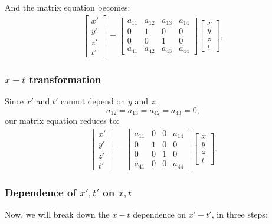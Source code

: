 \documentclass[a4paper,11pt]{article}
\numberwithin{equation}{section}
\begin{document}
 \noindent And the matrix equation becomes:
 \begin{gather}
 \begin{bmatrix} x' \\ y' \\ z' \\ t' \end{bmatrix}
 =
 \begin{bmatrix}
 a_{11} & a_{12} & a_{13} & a_{14}\\
 0 & 1 & 0 & 0\\
 0 & 0 & 1 & 0\\
 a_{41} & a_{42} & a_{43} & a_{44}
 \end{bmatrix}
 \begin{bmatrix}
 x \\ y \\ z \\ t
 \end{bmatrix},
 \end{gather}
   
 \subsubsection{$x-t$ transformation}
 Since $x'$ and $t'$ cannot depend on $y$ and $z$: $$ a_{12} = a_{13} = a_{42} = a_{43} = 0,$$ our matrix equation reduces to:
 \begin{gather}
 \begin{bmatrix} x' \\ y' \\ z' \\ t' \end{bmatrix}
 =
 \begin{bmatrix}
 a_{11} & 0 & 0 & a_{14}\\
 0 & 1 & 0 & 0\\
 0 & 0 & 1 & 0\\
 a_{41} & 0 & 0 & a_{44}
 \end{bmatrix}
 \begin{bmatrix}
 x \\ y \\ z \\ t
 \end{bmatrix}.
 \end{gather}
 
 \subsubsection{Dependence of $x',t'$ on $x,t$}
 Now, we will break down the $x-t$ dependence on $x'-t'$, in three steps:
 
\end{document}
